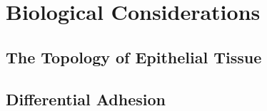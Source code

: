 \chapter{Biological Considerations}
\section{The Topology of Epithelial Tissue}
\section{Differential Adhesion}